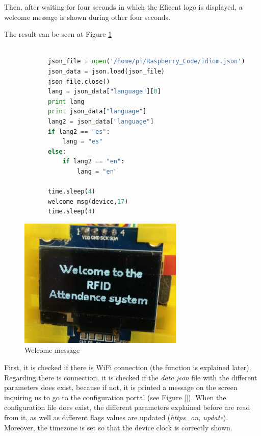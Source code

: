 \documentclass[12pt,a4paper,oneside]{article} %
\begin{document}
Then, after waiting for four seconds in which the Eficent logo is displayed, a welcome message is shown during other four seconds.

The result can be seen at Figure \ref{wlcm-msg}

\begin{lstlisting}[language=python]

			json_file = open('/home/pi/Raspberry_Code/idiom.json')
	        json_data = json.load(json_file)
	        json_file.close()
	        lang = json_data["language"][0]
	        print lang
	        print json_data["language"]
	        lang2 = json_data["language"]
	        if lang2 == "es":
	            lang = "es"
	        else:
	            if lang2 == "en":
	                lang = "en"
	
	        time.sleep(4)
	        welcome_msg(device,17)
	        time.sleep(4)

\end{lstlisting}

\begin{figure}[h]
	\centering
	\includegraphics[width=0.7\textwidth]{images/welcome_msg.png}
	\caption[Welcome message]{Welcome message}
	\label{wlcm-msg}
\end{figure}

First, it is checked if there is WiFi connection (the function is explained later). Regarding there is connection, it is checked if the \emph{data.json} file with the different parameters does exist, because if not, it is printed a message on the screen inquiring us to go to the configuration portal (see Figure \ref{}). When the configuration file does exist, the different parameters explained before are read from it, as well as different flags values are updated (\textit{https\_on, update}). Moreover, the timezone is set so that the device clock is correctly shown.
\end{document}
